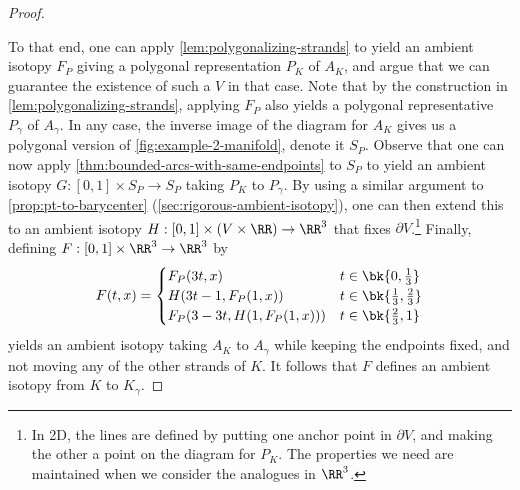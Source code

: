 \begin{proof}
\begin{figure}[H]
  \end{figure}
  To that end, one can apply \cref{lem:polygonalizing-strands} to
  yield an ambient isotopy $F_P$ giving a polygonal representation
  $P_K$ of $A_K$, and argue that we can guarantee the existence of
  such a $V$ in that case. Note that by the construction in
  \cref{lem:polygonalizing-strands}, applying $F_P$ also yields a
  polygonal representative $P_\gamma$ of $A_\gamma$. In any case, the
  inverse image of the diagram for $A_K$ gives us a polygonal version
  of \cref{fig:example-2-manifold}, denote it $S_P$. Observe that one
  can now apply \cref{thm:bounded-arcs-with-same-endpoints} to $S_P$
  to yield an ambient isotopy $G : [0,1] \times S_P \to S_P$ taking
  $P_K$ to $P_\gamma$. By using a similar argument to
  \cref{prop:pt-to-barycenter} (\cref{sec:rigorous-ambient-isotopy}),
  one can then extend this to an ambient isotopy $H : [0,1] \times (V
  \times \RR) \to \RR^3$ that fixes $\partial V$.\footnote{In 2D, the
    lines are defined by putting one anchor point in $\partial V$, and
    making the other a point on the diagram for $P_K$. The properties
    we need are maintained when we consider the analogues in $\RR^3$.}
  Finally, defining $F : [0,1] \times \RR^3 \to \RR^3$ by
  \[
    F(t, x) =
    \begin{cases}
      F_P(3t, x) & t \in \bk{0, \frac{1}{3}} \\
      H(3t - 1, F_P(1, x)) & t \in \bk{\frac{1}{3}, \frac{2}{3}} \\
      F_P(3-3t, H(1,F_P(1, x))) & t \in \bk{\frac{2}{3}, 1}
    \end{cases}
  \]
  yields an ambient isotopy taking $A_K$ to $A_\gamma$ while keeping
  the endpoints fixed, and not moving any of the other strands of $K$.
  It follows that $F$ defines an ambient isotopy from $K$ to
  $K_\gamma$.
\end{proof}







